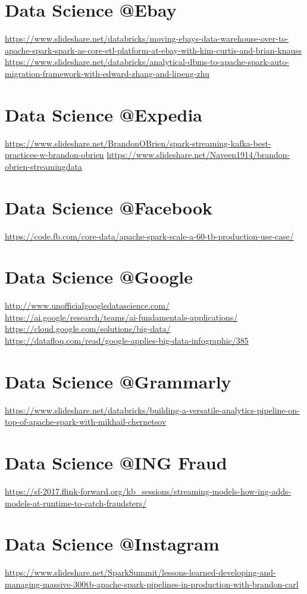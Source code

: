 \documentclass[12pt, numbers=noenddot]{scrreprt} %
\begin{document}
\section{Data Science @Ebay}
\url{https://www.slideshare.net/databricks/moving-ebays-data-warehouse-over-to-apache-spark-spark-as-core-etl-platform-at-ebay-with-kim-curtis-and-brian-knauss}
\url{https://www.slideshare.net/databricks/analytical-dbms-to-apache-spark-auto-migration-framework-with-edward-zhang-and-lipeng-zhu}

\section{Data Science @Expedia}
\url{https://www.slideshare.net/BrandonOBrien/spark-streaming-kafka-best-practices-w-brandon-obrien}
\url{https://www.slideshare.net/Naveen1914/brandon-obrien-streamingdata}

\section{Data Science @Facebook}
\url{https://code.fb.com/core-data/apache-spark-scale-a-60-tb-production-use-case/}

\section{Data Science @Google}
\url{http://www.unofficialgoogledatascience.com/} \\
\url{https://ai.google/research/teams/ai-fundamentals-applications/} \\
\url{https://cloud.google.com/solutions/big-data/} \\
\url{https://datafloq.com/read/google-applies-big-data-infographic/385}

\section{Data Science @Grammarly}
\url{https://www.slideshare.net/databricks/building-a-versatile-analytics-pipeline-on-top-of-apache-spark-with-mikhail-chernetsov}

\section{Data Science @ING Fraud}
\url{https://sf-2017.flink-forward.org/kb_sessions/streaming-models-how-ing-adds-models-at-runtime-to-catch-fraudsters/}

\section{Data Science @Instagram}
\url{https://www.slideshare.net/SparkSummit/lessons-learned-developing-and-managing-massive-300tb-apache-spark-pipelines-in-production-with-brandon-carl}
\end{document}
